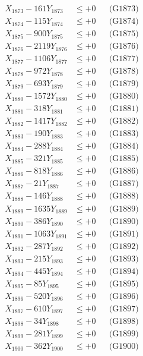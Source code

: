 \documentclass[a4paper,10pt]{article}
\begin{document}
{\begin{align}
X_{1873} - 161Y_{1873} &\leq +0 && \text{(G1873)} \\
X_{1874} - 115Y_{1874} &\leq +0 && \text{(G1874)} \\
X_{1875} - 900Y_{1875} &\leq +0 && \text{(G1875)} \\
X_{1876} - 2119Y_{1876} &\leq +0 && \text{(G1876)} \\
X_{1877} - 1106Y_{1877} &\leq +0 && \text{(G1877)} \\
X_{1878} - 972Y_{1878} &\leq +0 && \text{(G1878)} \\
X_{1879} - 693Y_{1879} &\leq +0 && \text{(G1879)} \\
X_{1880} - 1572Y_{1880} &\leq +0 && \text{(G1880)} \\
\allowbreak
X_{1881} - 318Y_{1881} &\leq +0 && \text{(G1881)} \\
X_{1882} - 1417Y_{1882} &\leq +0 && \text{(G1882)} \\
X_{1883} - 190Y_{1883} &\leq +0 && \text{(G1883)} \\
X_{1884} - 288Y_{1884} &\leq +0 && \text{(G1884)} \\
X_{1885} - 321Y_{1885} &\leq +0 && \text{(G1885)} \\
X_{1886} - 818Y_{1886} &\leq +0 && \text{(G1886)} \\
X_{1887} - 21Y_{1887} &\leq +0 && \text{(G1887)} \\
X_{1888} - 146Y_{1888} &\leq +0 && \text{(G1888)} \\
X_{1889} - 1635Y_{1889} &\leq +0 && \text{(G1889)} \\
X_{1890} - 386Y_{1890} &\leq +0 && \text{(G1890)} \\
\allowbreak
X_{1891} - 1063Y_{1891} &\leq +0 && \text{(G1891)} \\
X_{1892} - 287Y_{1892} &\leq +0 && \text{(G1892)} \\
X_{1893} - 215Y_{1893} &\leq +0 && \text{(G1893)} \\
X_{1894} - 445Y_{1894} &\leq +0 && \text{(G1894)} \\
X_{1895} - 85Y_{1895} &\leq +0 && \text{(G1895)} \\
X_{1896} - 520Y_{1896} &\leq +0 && \text{(G1896)} \\
X_{1897} - 610Y_{1897} &\leq +0 && \text{(G1897)} \\
X_{1898} - 34Y_{1898} &\leq +0 && \text{(G1898)} \\
X_{1899} - 281Y_{1899} &\leq +0 && \text{(G1899)} \\
X_{1900} - 362Y_{1900} &\leq +0 && \text{(G1900)} \\

\end{align}}
\end{document}

